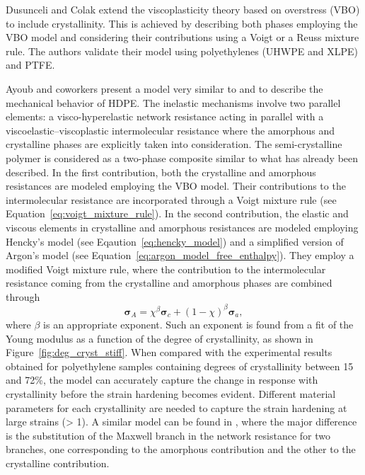 Dusunceli and Colak \citep{dusunceliModellingEffectsDegree2008} extend the viscoplasticity theory based on overstress (VBO) to include crystallinity.
This is achieved by describing both phases employing the VBO model and considering their contributions using a Voigt or a Reuss mixture rule.
The authors validate their model using polyethylenes (UHWPE and XLPE) and PTFE.

Ayoub and coworkers \citep{ayoubModellingLargeDeformation2010, ayoubEffectsCrystalContent2011} present a model very similar to \cite{ahziModelingDeformationBehavior2003} and \cite{boyceConstitutiveModelFinite2000} to describe the mechanical behavior of HDPE.
The inelastic mechanisms involve two parallel elements: a visco-hyperelastic network resistance acting in parallel with a viscoelastic–viscoplastic intermolecular resistance where the amorphous and crystalline phases are explicitly taken into consideration.
The semi-crystalline polymer is considered as a two-phase composite similar to what has already been described.
In the first contribution, both the crystalline and amorphous resistances are modeled employing the VBO model.
Their contributions to the intermolecular resistance are incorporated through a Voigt mixture rule (see Equation~\eqref{eq:voigt_mixture_rule}).
In the second contribution, the elastic and viscous elements in crystalline and amorphous resistances are modeled employing Hencky's model (see Eqaution~\eqref{eq:hencky_model}) and a simplified version of Argon's model (see Equation~\eqref{eq:argon_model_free_enthalpy}).
They employ a modified Voigt mixture rule, where the contribution to the intermolecular resistance  coming from the crystalline and amorphous phases are combined through
\begin{equation}
  \label{eq:mod_voigt_mixture_rule}
  \bm \sigma_A = \chi^\beta \bm \sigma_c + (1-\chi)^\beta \bm \sigma_a,
\end{equation}
where $\beta$ is an appropriate exponent.
Such an exponent is found from a fit of the Young modulus as a function of the degree of crystallinity, as shown in Figure~\ref{fig:deg_cryst_stiff}.
When compared with the experimental results obtained for polyethylene samples containing degrees of crystallinity between 15 and 72\%, the model can accurately capture the change in response with crystallinity before the strain hardening becomes evident.
Different material parameters for each crystallinity are needed to capture the strain hardening at large strains (> 1).
A similar model can be found in \cite{abdul-hameedTwophaseHyperelasticviscoplasticConstitutive2014}, where the major difference is the substitution of the Maxwell branch in the network resistance for two branches, one corresponding to the amorphous contribution and the other to the crystalline contribution.
